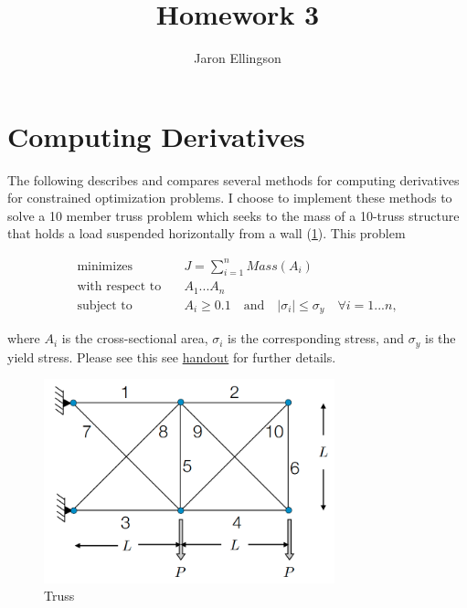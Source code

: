 \documentclass{article}
\begin{document}
\title{Homework 3}
\author{Jaron Ellingson}
\maketitle


\section*{Computing Derivatives}

The following describes and compares several methods for computing derivatives for constrained optimization problems. I choose to implement these methods to solve a 10 member truss problem which seeks to the mass of a 10-truss structure that holds a load suspended horizontally from a wall (\cref{fig:truss}). This problem 

\begin{equation*}
\begin{aligned}
\text{minimizes} & \quad J= \sum_{i=1}^{n} Mass(A_i) \\
\text{with respect to} & \quad A_1 ... A_{n} \\
\text{subject to} & \quad A_i \ge 0.1 \quad \text{and} \quad | \sigma_i | \le \sigma_y \quad \forall i=1 ... n,
\end{aligned}
\end{equation*}

where $A_i$ is the cross-sectional area, $\sigma_i$ is the corresponding stress, and $\sigma_y$ is the yield stress. Please see this see \href{https://byu.box.com/shared/static/h8gzy7nuzzk42ta7388y1luj3yhgsltq.pdf}{handout} for further details.


\begin{figure}[htbp]
	\centering
	
	\includegraphics[width=0.75\textwidth]{truss.png}
	
	\caption{Truss}
	\label{fig:truss}
\end{figure}
\end{document}
